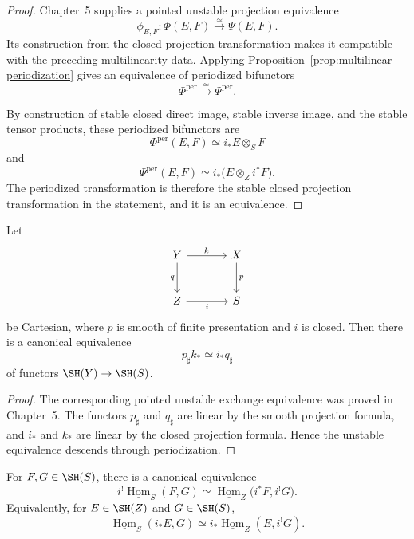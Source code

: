 \begin{proof}
Chapter~5 supplies a pointed unstable projection equivalence
\[
    \phi_{E,F}:
    \Phi(E,F)
    \xrightarrow{\simeq}
    \Psi(E,F).
\]
Its construction from the closed projection transformation makes it
compatible with the preceding multilinearity data.  Applying
Proposition~\ref{prop:multilinear-periodization} gives an equivalence of
periodized bifunctors
\[
    \Phi^{\mathrm{per}}
    \xrightarrow{\simeq}
    \Psi^{\mathrm{per}}.
\]

By construction of stable closed direct image, stable inverse image, and the
stable tensor products, these periodized bifunctors are
\[
    \Phi^{\mathrm{per}}(E,F)
    \simeq
    i_*E\otimes_SF
\]
and
\[
    \Psi^{\mathrm{per}}(E,F)
    \simeq
    i_*\bigl(E\otimes_Zi^*F\bigr).
\]
The periodized transformation is therefore the stable closed projection
transformation in the statement, and it is an equivalence.
\end{proof}

\begin{theorem}
\label{thm:stable-smooth-closed-exchange}
Let
\[
\begin{tikzcd}[column sep=large,row sep=large]
    Y \arrow[r,"k"] \arrow[d,"q"']
        & X \arrow[d,"p"] \\
    Z \arrow[r,"i"'] & S
\end{tikzcd}
\]
be Cartesian, where $p$ is smooth of finite presentation and $i$ is closed.  Then there is a
canonical equivalence
\[
    p_\sharp k_*
    \simeq
    i_*q_\sharp
\]
of functors $\SH(Y)\to\SH(S)$.
\end{theorem}

\begin{proof}
The corresponding pointed unstable exchange equivalence was proved in Chapter~5.  The functors
$p_\sharp$ and $q_\sharp$ are linear by the smooth projection formula, and $i_*$ and $k_*$ are
linear by the closed projection formula.  Hence the unstable equivalence descends through
periodization.
\end{proof}

\begin{proposition}
\label{prop:closed-internal-hom}
For $F,G\in\SH(S)$, there is a canonical equivalence
\[
    i^!\underline{\operatorname{Hom}}_S(F,G)
    \simeq
    \underline{\operatorname{Hom}}_Z
    \bigl(i^*F,i^!G\bigr).
\]
Equivalently, for $E\in\SH(Z)$ and $G\in\SH(S)$,
\[
    \underline{\operatorname{Hom}}_S(i_*E,G)
    \simeq
    i_*\underline{\operatorname{Hom}}_Z(E,i^!G).
\]
\end{proposition}

